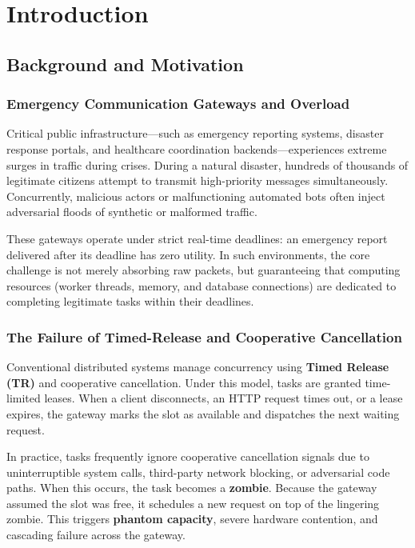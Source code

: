 \documentclass[12pt,a4paper]{report}
\begin{document}

\chapter{Introduction}

\section{Background and Motivation}

\subsection{Emergency Communication Gateways and Overload}
Critical public infrastructure—such as emergency reporting systems, disaster response portals, and healthcare coordination backends—experiences extreme surges in traffic during crises. During a natural disaster, hundreds of thousands of legitimate citizens attempt to transmit high-priority messages simultaneously. Concurrently, malicious actors or malfunctioning automated bots often inject adversarial floods of synthetic or malformed traffic. 

These gateways operate under strict real-time deadlines: an emergency report delivered after its deadline has zero utility. In such environments, the core challenge is not merely absorbing raw packets, but guaranteeing that computing resources (worker threads, memory, and database connections) are dedicated to completing legitimate tasks within their deadlines.

\subsection{The Failure of Timed-Release and Cooperative Cancellation}
Conventional distributed systems manage concurrency using \textbf{Timed Release (TR)} and cooperative cancellation. Under this model, tasks are granted time-limited leases. When a client disconnects, an HTTP request times out, or a lease expires, the gateway marks the slot as available and dispatches the next waiting request.

In practice, tasks frequently ignore cooperative cancellation signals due to uninterruptible system calls, third-party network blocking, or adversarial code paths. When this occurs, the task becomes a \textbf{zombie}. Because the gateway assumed the slot was free, it schedules a new request on top of the lingering zombie. This triggers \textbf{phantom capacity}, severe hardware contention, and cascading failure across the gateway.
\end{document}
